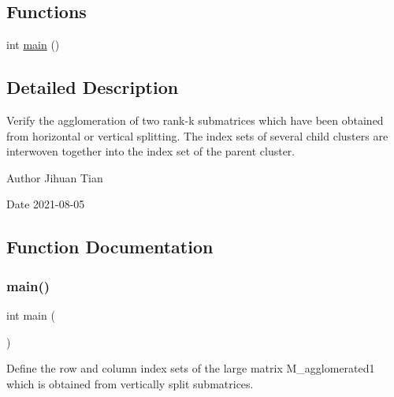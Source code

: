 \subsection*{Functions}
\begin{DoxyCompactItemize}
\item 
int \hyperlink{rkmatrix-agglomeration-of-two-submatrices-interwoven-indices_8cc_ae66f6b31b5ad750f1fe042a706a4e3d4}{main} ()
\end{DoxyCompactItemize}


\subsection{Detailed Description}
Verify the agglomeration of two rank-\/k submatrices which have been obtained from horizontal or vertical splitting. The index sets of several child clusters are interwoven together into the index set of the parent cluster. 

\begin{DoxyAuthor}{Author}
Jihuan Tian 
\end{DoxyAuthor}
\begin{DoxyDate}{Date}
2021-\/08-\/05 
\end{DoxyDate}


\subsection{Function Documentation}
\mbox{\label{rkmatrix-agglomeration-of-two-submatrices-interwoven-indices_8cc_ae66f6b31b5ad750f1fe042a706a4e3d4}} 
\subsubsection{\texorpdfstring{main()}{main()}}
{\footnotesize\ttfamily int main (\begin{DoxyParamCaption}{ }\end{DoxyParamCaption})}

Define the row and column index sets of the large matrix {\ttfamily M\+\_\+agglomerated1} which is obtained from vertically split submatrices.

